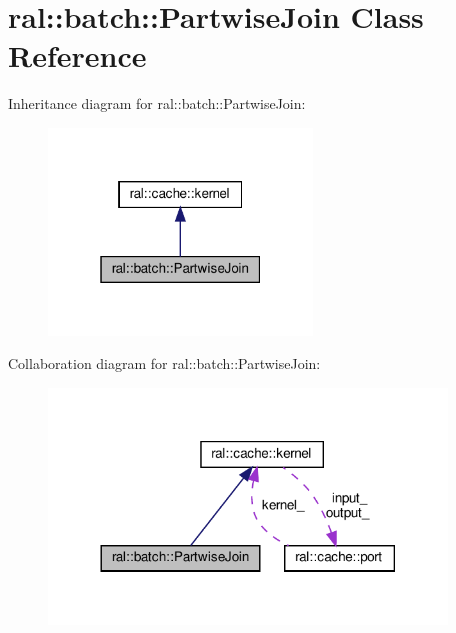 \hypertarget{classral_1_1batch_1_1PartwiseJoin}{}\section{ral\+:\+:batch\+:\+:Partwise\+Join Class Reference}
\label{classral_1_1batch_1_1PartwiseJoin}


Inheritance diagram for ral\+:\+:batch\+:\+:Partwise\+Join\+:\nopagebreak
\begin{figure}[H]
\begin{center}
\leavevmode
\includegraphics[width=199pt]{classral_1_1batch_1_1PartwiseJoin__inherit__graph}
\end{center}
\end{figure}


Collaboration diagram for ral\+:\+:batch\+:\+:Partwise\+Join\+:\nopagebreak
\begin{figure}[H]
\begin{center}
\leavevmode
\includegraphics[width=300pt]{classral_1_1batch_1_1PartwiseJoin__coll__graph}
\end{center}
\end{figure}

